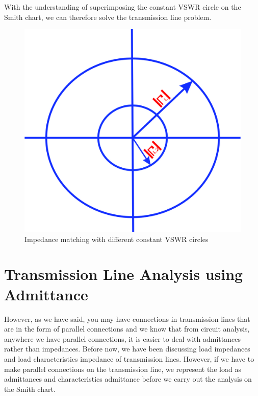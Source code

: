 With the understanding of superimposing the constant VSWR circle on the Smith chart, we can therefore solve the transmission line problem.
\begin{figure}[h]
\centering
\includegraphics[width=0.57\linewidth]{graphics/poiuyfd}
\caption{Impedance matching with different constant VSWR circles}
\label{fig:poiuyfd}
\end{figure}

\section{Transmission Line Analysis using Admittance}
However, as we have said, you may have connections in transmission lines that are in the form of parallel connections and we know that from circuit analysis, anywhere we have parallel connections, it is easier to deal with admittances rather than impedances. Before now, we have been discussing load impedances and load characteristics impedance of transmission lines. However, if we have to make parallel connections on the transmission line, we represent the load as admittances and characteristics admittance  before we carry out the analysis on the Smith chart. 

